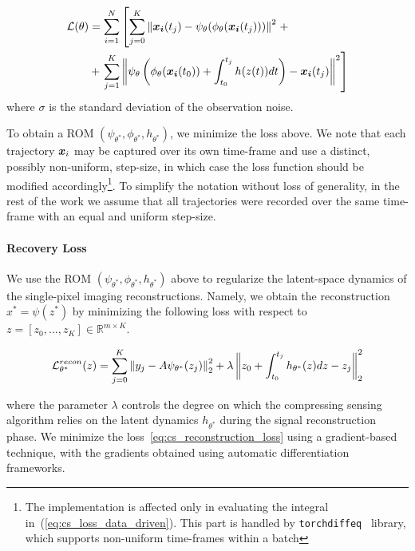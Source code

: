 \begin{align}
    \label{eq:cs_loss_data_driven}
    \operatorname{\mathcal{L}}(\theta) & = \sum_{i = 1}^N \left[\sum_{j=0}^K\left\|\boldsymbol{x_i}(t_j) - \psi_\theta(\phi_\theta(\boldsymbol{x_i}(t_j)))\right\|^2\right. + \\
     & + \left.\sum_{j=1}^K \left\|\psi_\theta\left(\phi_\theta(\boldsymbol{x_i}(t_0)) + \int_{t_0}^{t_j}h(z(t))dt\right) - \boldsymbol{x_i}(t_j)\right\|^2 \right]
\end{align}
where $\sigma$ is the standard deviation of the observation noise.

To obtain a ROM $(\psi_{\theta^*}, \phi_{\theta^*}, h_{\theta^*})$, we minimize the loss above. We note that each trajectory $\boldsymbol{x}_i$ may be captured over its own time-frame and use a distinct, possibly non-uniform, step-size, in which case the loss function should be modified accordingly\footnote{The implementation is affected only in evaluating the integral in~(\ref{eq:cs_loss_data_driven}). This part is handled by \texttt{torchdiffeq}~\citep{chen2018neural} library, which supports non-uniform time-frames within a batch}. To simplify the notation without loss of generality, in the rest of the work we assume that all trajectories were recorded over the same time-frame with an equal and uniform step-size. 

\paragraph{Recovery Loss} 
We use the ROM $(\psi_{\theta^*}, \phi_{\theta^*}, h_{\theta^*})$ above to regularize the latent-space dynamics of the single-pixel imaging reconstructions. Namely, we obtain the reconstruction $x^* = \psi(z^*)$ by minimizing the following loss with respect to $z = [z_0, \dots, z_K] \in \mathbb{R}^{m \times K}$.

\begin{equation}
    \label{eq:cs_reconstruction_loss}
     \operatorname{\mathcal{L}}_{\theta^*}^{recon}(z) = \sum_{j=0}^K  \left\|y_j - A\psi_{\theta^*}(z_j)\right\|_2^2 + \lambda \left\|z_0
     + \int_{t_0}^{t_j}h_{\theta^*}(z)dz - z_j\right\|_2^2
\end{equation}

where the parameter $\lambda$ controls the degree on which the compressing sensing algorithm relies on the latent dynamics $h_{\theta^*}$ during the signal reconstruction phase. We minimize the loss~\ref{eq:cs_reconstruction_loss} using a gradient-based technique, with the gradients obtained using automatic differentiation frameworks. 

